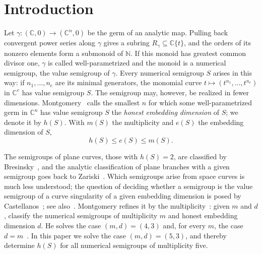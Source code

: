 \documentclass{amsart}
\theoremstyle{definition}
\theoremstyle{remark}
\numberwithin{equation}{section}
\newcommand{\N}{\mathbb{N}}
\newcommand{\C}{\mathbb{C}}
\begin{document}
\section{Introduction}

Let $\gamma\colon(\C,0)\to(\C^n,0)$ be the germ of an analytic map. Pulling back convergent power series along $\gamma$ gives a subring $R_\gamma\subseteq\C\{t\}$, and the orders of its nonzero elements form a submonoid of $\N$. If this monoid has greatest common divisor one, $\gamma$ is called well-parametrized and the monoid is a numerical semigroup, the value semigroup of $\gamma$. Every numerical semigroup $S$ arises in this way: if $n_1,\dots,n_e$ are its minimal generators, the monomial curve $t\mapsto(t^{n_1},\dots,t^{n_e})$ in $\C^e$ has value semigroup $S$. The semigroup may, however, be realized in fewer dimensions. Montgomery~\cite{Mon} calls the smallest $n$ for which some well-parametrized germ in $\C^n$ has value semigroup $S$ the \emph{honest embedding dimension} of $S$; we denote it by $h(S)$. With $m(S)$ the multiplicity and $e(S)$ the embedding dimension of $S$,
\begin{equation}\label{eq:basic}
h(S)\le e(S)\le m(S).
\end{equation}

The semigroups of plane curves, those with $h(S)=2$, are classified by Bresinsky~\cite{Bre}, and the analytic classification of plane branches with a given semigroup goes back to Zariski~\cite{Zar}. Which semigroups arise from space curves is much less understood; the question of deciding whether a semigroup is the value semigroup of a curve singularity of a given embedding dimension is posed by Castellanos~\cite[Problem~2.4]{Cas}; see also~\cite[Section~4.2]{Ham}. Montgomery refines it by the multiplicity~\cite[Problem~3]{Mon}: given $m$ and $d$, classify the numerical semigroups of multiplicity $m$ and honest embedding dimension $d$. He solves the case $(m,d)=(4,3)$ and, for every $m$, the case $d=m$~\cite[Theorems~1 and~2]{Mon}. In this paper we solve the case $(m,d)=(5,3)$, and thereby determine $h(S)$ for all numerical semigroups of multiplicity five.
\end{document}
